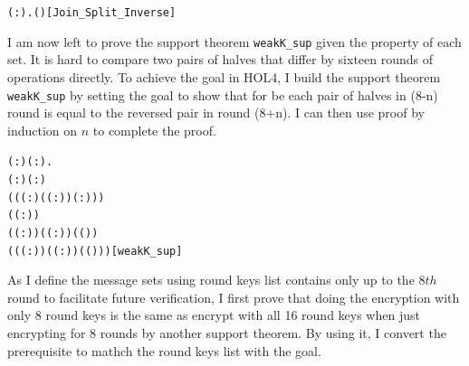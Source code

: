 \documentclass{article}
\begin{document}
\begin{alltt}
\HOLTokenTurnstile{} \HOLSymConst{\HOLTokenForall{}}( :).  ( ) \HOLSymConst{=} \hfill{[Join_Split_Inverse]}
\end{alltt}

I am now left to prove the support theorem \verb|weakK_sup| given the property of each set. It is hard to compare two pairs of
halves that differ by sixteen rounds of operations directly. To achieve the goal in HOL4, I build the support theorem
\verb|weakK_sup| by setting the goal to show that for be each pair of halves in (8-n) round is equal to the reversed pair
in round (8+n). I can then use proof by induction on $n$ to complete the proof.

\begin{alltt}
\HOLTokenTurnstile{} \HOLSymConst{\HOLTokenForall{}}( :) ( :).
        \HOLSymConst{\HOLTokenConj{}} ( :) \HOLSymConst{\HOLTokenLeq{}}  \HOLSymConst{\HOLTokenConj{}}  \HOLSymConst{\HOLTokenLeq{}} ( :) \HOLSymConst{\HOLTokenConj{}}
      ( ( ( :) (  ( :)) ( :))) \HOLSymConst{=}
     (( :)\HOLSymConst{,}) \HOLSymConst{\HOLTokenImp{}}
      (( :) \HOLSymConst{\ensuremath{-}} ) (  ( :)) ( ( )) \HOLSymConst{=}
       ( (( :) \HOLSymConst{\ensuremath{+}} ) (  ( :)) ( ( )))\hfill{[weakK_sup]}
\end{alltt}

As I define the message sets using round keys list contains only up to the $8th$ round to facilitate future verification,
I first prove that doing the encryption with only 8 round keys is the same as encrypt with all 16 round keys
when just encrypting for 8 rounds by another support theorem. By using it, I convert the prerequisite to mathch the
round keys list with the goal.
\end{document}
